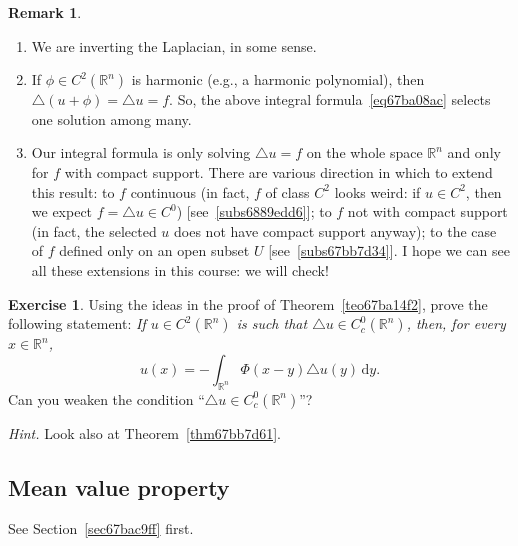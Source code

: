 \documentclass[a4paper,9pt]{amsart}
\newcommand{\R}{\mathbb{R}}	%
\newcommand{\did}{\,\mathrm{d}}	%
\newcommand{\laplacian}{\triangle}
\theoremstyle{plain}
\theoremstyle{definition}
\newtheorem{remark}[proposition]{Remark}
\newtheorem{exercise}[proposition]{Exercise}%
\theoremstyle{remark}
\begin{document}
\begin{remark}
	\begin{enumerate}
	\item We are inverting the Laplacian, in some sense.
	\item If $\phi\in C^2(\R^n)$ is harmonic (e.g., a harmonic polynomial), then $\laplacian (u+\phi) = \laplacian u = f$. So, the above integral formula~\eqref{eq67ba08ac} selects one solution among many.
	\item Our integral formula is only solving $\laplacian u = f$ on the whole space $\R^n$ and only for $f$ with compact support.
	There are various direction in which to extend this result: 
	to $f$ continuous (in fact, $f$ of class $C^2$ looks weird: if $u\in C^2$, then we expect $f=\laplacian u\in C^0$) [see~\ref{subs6889edd6}];
	to $f$ not with compact support (in fact, the selected $u$ does not have compact support anyway);
	to the case of $f$ defined only on an open subset $U$ [see~\ref{subs67bb7d34}].
	I hope we can see all these extensions in this course: we will check!
	\end{enumerate}
\end{remark}

\begin{exercise}
	Using the ideas in the proof of Theorem~\ref{teo67ba14f2}, prove the following statement:
	{\it 
	If $u\in C^2(\R^n)$ is such that $\laplacian u\in C^0_c(\R^n)$, then, for every $x\in\R^n$,
	\begin{equation}
		u(x) = - \int_{\R^n} \Phi(x-y) \laplacian u(y) \did y .
	\end{equation}
	}
	Can you weaken the condition ``$\laplacian u\in C^0_c(\R^n)$''?
	
	{\it Hint.} Look also at Theorem~\ref{thm67bb7d61}.
\end{exercise}

\subsection{Mean value property}\label{subs67bac7f9}

See Section~\ref{sec67bac9ff} first.
\end{document}
